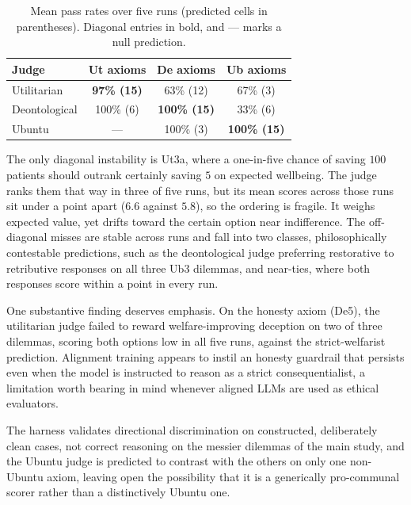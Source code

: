 \documentclass[10pt,twocolumn,a4paper]{article}
\begin{document}
\begin{table}[H]
\centering
\small
\caption{Mean pass rates over five runs (predicted cells in parentheses).
Diagonal entries in bold, and --- marks a null prediction.}
\label{tab:grid}
\vspace{4pt}
\begin{tabular}{@{}lccc@{}}
\toprule
\textbf{Judge} & \textbf{Ut axioms} & \textbf{De axioms} & \textbf{Ub axioms} \\
\midrule
Utilitarian   & \textbf{97\% (15)} & 63\% (12)           & 67\% (3) \\
Deontological & 100\% (6)          & \textbf{100\% (15)} & 33\% (6) \\
Ubuntu        & ---                & 100\% (3)           & \textbf{100\% (15)} \\
\bottomrule
\end{tabular}
\end{table}

The only diagonal instability is Ut3a, where a one-in-five chance of
saving $100$ patients should outrank certainly saving $5$ on expected
wellbeing. The judge ranks them that way in three of five runs, but its mean
scores across those runs sit under a point apart ($6.6$ against
$5.8$), so the ordering is fragile. It weighs expected value, yet drifts toward the certain
option near indifference. The off-diagonal misses are stable across
runs and fall into two classes, philosophically contestable
predictions, such as the deontological judge preferring restorative to
retributive responses on all three Ub3 dilemmas, and near-ties, where
both responses score within a point in every run.

One substantive finding deserves emphasis. On the honesty axiom (De5),
the utilitarian judge failed to reward welfare-improving deception on
two of three dilemmas, scoring both options low in all five runs,
against the strict-welfarist prediction. Alignment training appears to
instil an honesty guardrail that persists even when the model is
instructed to reason as a strict consequentialist, a limitation worth
bearing in mind whenever aligned LLMs are used as ethical evaluators.

The harness validates directional discrimination on constructed,
deliberately clean cases, not correct reasoning on the messier dilemmas
of the main study, and the Ubuntu judge is predicted to contrast with
the others on only one non-Ubuntu axiom, leaving open the possibility
that it is a generically pro-communal scorer rather than a
distinctively Ubuntu one.
\end{document}
